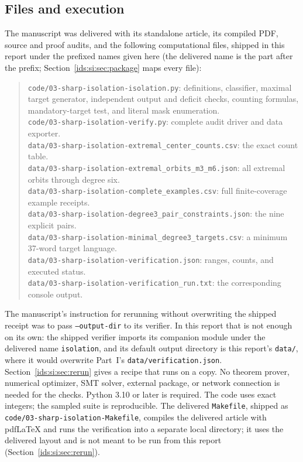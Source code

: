 \documentclass[11pt,letterpaper]{article}
\theoremstyle{definition}\newtheorem{definition}[theorem]{Definition}
\theoremstyle{remark}\newtheorem{remark}[theorem]{Remark}
\theoremstyle{definition}\newtheorem{question}[theorem]{Question}
\begin{document}
\subsection{Files and execution}
The manuscript was delivered with its standalone article, its compiled PDF,
source and proof audits, and the following computational files, shipped in
this report under the prefixed names given here (the delivered name is the
part after the prefix; Section~\ref{ids:si:sec:package} maps every file):
\begin{quote}\small
\nolinkurl{code/03-sharp-isolation-isolation.py}: definitions, classifier, maximal target generator,
independent output and deficit checks, counting formulas, mandatory-target
test, and literal mask enumeration.\\
\nolinkurl{code/03-sharp-isolation-verify.py}: complete audit driver and data exporter.\\
\nolinkurl{data/03-sharp-isolation-extremal_center_counts.csv}: the exact count table.\\
\nolinkurl{data/03-sharp-isolation-extremal_orbits_m3_m6.json}: all extremal orbits through degree six.\\
\nolinkurl{data/03-sharp-isolation-complete_examples.csv}: full finite-coverage example receipts.\\
\nolinkurl{data/03-sharp-isolation-degree3_pair_constraints.json}: the nine explicit pairs.\\
\nolinkurl{data/03-sharp-isolation-minimal_degree3_targets.csv}: a minimum 37-word target language.\\
\nolinkurl{data/03-sharp-isolation-verification.json}: ranges, counts, and executed status.\\
\nolinkurl{data/03-sharp-isolation-verification_run.txt}: the corresponding console output.
\end{quote}
The manuscript's instruction for rerunning without overwriting the shipped
receipt was to pass \texttt{--output-dir} to its verifier. In this report
that is not enough on its own: the shipped verifier imports its companion
module under the delivered name \texttt{isolation}, and its default output
directory is this report's \texttt{data/}, where it would overwrite Part~I's
\texttt{data/verification.json}. Section~\ref{ids:si:sec:rerun} gives a
recipe that runs on a copy. No theorem prover, numerical optimizer, SMT solver, external package, or
network connection is needed for the checks. Python 3.10 or later is
required. The code uses exact integers; the sampled suite is reproducible.
The delivered \texttt{Makefile}, shipped as
\nolinkurl{code/03-sharp-isolation-Makefile}, compiles the delivered article
with pdfLaTeX and runs the verification into a separate local directory; it
uses the delivered layout and is not meant to be run from this report
(Section~\ref{ids:si:sec:rerun}).
\end{document}
